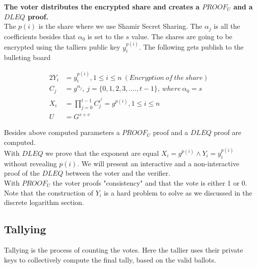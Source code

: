 \noindent
\textbf{The voter distributes the encrypted share and creates a $PROOF_U$ and a $DLEQ$ proof.}\\
The \begin{math}p(i)\end{math} is the share where we use Shamir Secret Sharing. The \begin{math}\alpha_j\end{math} is all the coefficients besides that $\alpha_0$ is set to the $s$ value. The shares are going to be encrypted using the talliers public key $y_i^{p(i)}$. The following gets publish to the bulleting board

\begin{alignat*}{2}
Y_i&=y_i^{p(i)} ,1\leq i\leq n \ (Encryption \ of \ the \ share) \\ 
C_j&=g^{\alpha_j},\ j =\{0,1,2,3,....,t-1 \}, \ where \ \alpha_0 = s  \\ 
X_i&=\prod\limits_{j=0}^{t-1} C_j^{i^j} =g^{p(i)}, 1\leq i\leq n\\
U&=G^{s+v}
\end{alignat*}

\noindent
Besides above computed parameters a  $PROOF_U$ proof and a $DLEQ$ proof are computed. \\

\noindent
With $DLEQ$ we prove that the exponent are equal \begin{math}X_i=g^{p(i)}  \land Y_i=y_i^{p(i)} \end{math} without revealing \begin{math}{p(i)} \end{math}. We will present an interactive and a non-interactive proof of the $DLEQ$ between the voter and the verifier.\\

\noindent
With \begin{math} PROOF_U \end{math} the voter proofs "consistency" and that the vote is either 1 or 0. Note that the construction of $Y_i$ is a hard problem to solve as we discussed in the discrete logarithm section.




\subsection{Tallying}
Tallying is the process of counting the votes. Here the tallier uses their private keys to collectively compute the final tally, based on the valid ballots.\\



